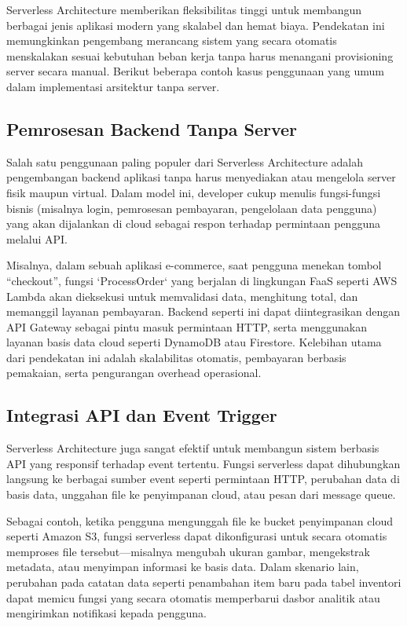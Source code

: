 Serverless Architecture memberikan fleksibilitas tinggi untuk membangun berbagai jenis aplikasi modern yang skalabel dan hemat biaya. Pendekatan ini memungkinkan pengembang merancang sistem yang secara otomatis menskalakan sesuai kebutuhan beban kerja tanpa harus menangani provisioning server secara manual. Berikut beberapa contoh kasus penggunaan yang umum dalam implementasi arsitektur tanpa server.

\subsection{Pemrosesan Backend Tanpa Server}

Salah satu penggunaan paling populer dari Serverless Architecture adalah pengembangan backend aplikasi tanpa harus menyediakan atau mengelola server fisik maupun virtual. Dalam model ini, developer cukup menulis fungsi-fungsi bisnis (misalnya login, pemrosesan pembayaran, pengelolaan data pengguna) yang akan dijalankan di cloud sebagai respon terhadap permintaan pengguna melalui API. 

Misalnya, dalam sebuah aplikasi e-commerce, saat pengguna menekan tombol “checkout”, fungsi `ProcessOrder` yang berjalan di lingkungan FaaS seperti AWS Lambda akan dieksekusi untuk memvalidasi data, menghitung total, dan memanggil layanan pembayaran. Backend seperti ini dapat diintegrasikan dengan API Gateway sebagai pintu masuk permintaan HTTP, serta menggunakan layanan basis data cloud seperti DynamoDB atau Firestore. Kelebihan utama dari pendekatan ini adalah skalabilitas otomatis, pembayaran berbasis pemakaian, serta pengurangan overhead operasional.

\subsection{Integrasi API dan Event Trigger}

Serverless Architecture juga sangat efektif untuk membangun sistem berbasis API yang responsif terhadap event tertentu. Fungsi serverless dapat dihubungkan langsung ke berbagai sumber event seperti permintaan HTTP, perubahan data di basis data, unggahan file ke penyimpanan cloud, atau pesan dari message queue.

Sebagai contoh, ketika pengguna mengunggah file ke bucket penyimpanan cloud seperti Amazon S3, fungsi serverless dapat dikonfigurasi untuk secara otomatis memproses file tersebut—misalnya mengubah ukuran gambar, mengekstrak metadata, atau menyimpan informasi ke basis data. Dalam skenario lain, perubahan pada catatan data seperti penambahan item baru pada tabel inventori dapat memicu fungsi yang secara otomatis memperbarui dasbor analitik atau mengirimkan notifikasi kepada pengguna.

